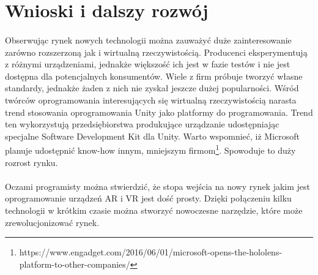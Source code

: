 \newpage
\section{Wnioski i dalszy rozwój}
\paragraph{}
Obserwując rynek nowych technologii można zauważyć duże zainteresowanie zarówno rozszerzoną jak i wirtualną rzeczywistością. Producenci eksperymentują z różnymi urządzeniami, jednakże większość ich jest w fazie testów i nie jest dostępna dla potencjalnych konsumentów.
Wiele z firm próbuje tworzyć własne standardy, jednakże żaden z nich nie zyskał jeszcze dużej popularności.
Wśród twórców oprogramowania interesujących się wirtualną rzeczywistością narasta trend stosowania oprogramowania Unity jako platformy do programowania. Trend ten wykorzystują przedsiębiorstwa produkujące urządzanie udostępniając specjalne Software Development Kit dla Unity. Warto wspomnieć, iż Microsoft planuje udostępnić know-how innym, mniejszym firmom\footnote{https://www.engadget.com/2016/06/01/microsoft-opens-the-hololens-platform-to-other-companies/}. Spowoduje to duży rozrost rynku.

\paragraph{}
Oczami programisty można stwierdzić, że stopa wejścia na nowy rynek jakim jest oprogramowanie urządzeń AR i VR jest dość prosty. Dzięki połączeniu kilku technologii w krótkim czasie można stworzyć nowoczesne narzędzie, które może zrewolucjonizować rynek.
